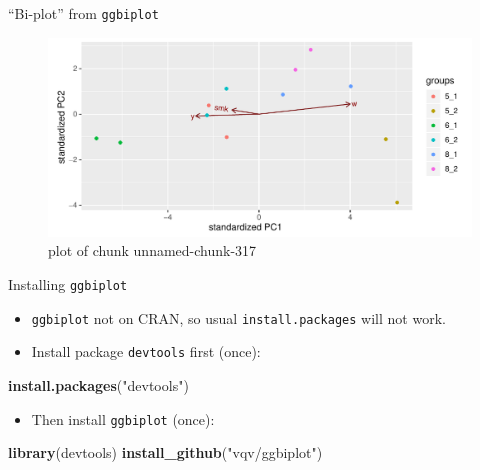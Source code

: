 \documentclass[ignorenonframetext,]{beamer}
\newenvironment{Shaded}{\begin{snugshade}}{\end{snugshade}}
\newcommand{\DataTypeTok}[1]{\textcolor[rgb]{0.13,0.29,0.53}{#1}}
\newcommand{\FloatTok}[1]{\textcolor[rgb]{0.00,0.00,0.81}{#1}}
\newcommand{\KeywordTok}[1]{\textcolor[rgb]{0.13,0.29,0.53}{\textbf{#1}}}
\newcommand{\NormalTok}[1]{#1}
\newcommand{\OperatorTok}[1]{\textcolor[rgb]{0.81,0.36,0.00}{\textbf{#1}}}
\newcommand{\StringTok}[1]{\textcolor[rgb]{0.31,0.60,0.02}{#1}}
\providecommand{\tightlist}{%
  \setlength{\itemsep}{0pt}\setlength{\parskip}{0pt}}
\begin{document}
\begin{frame}[fragile]{``Bi-plot'' from \texttt{ggbiplot}}
\protect\hypertarget{bi-plot-from-ggbiplot}{}

\begin{Shaded}
\end{Shaded}

\begin{figure}
\centering
\includegraphics{figure/unnamed-chunk-317-1.pdf}
\caption{plot of chunk unnamed-chunk-317}
\end{figure}

\end{frame}

\begin{frame}[fragile]{Installing \texttt{ggbiplot}}
\protect\hypertarget{installing-ggbiplot}{}

\begin{itemize}
\item
  \texttt{ggbiplot} not on CRAN, so usual \texttt{install.packages} will
  not work.
\item
  Install package \texttt{devtools} first (once):
\end{itemize}

\begin{Shaded}
\begin{Highlighting}[]
\KeywordTok{install.packages}\NormalTok{(}\StringTok{"devtools"}\NormalTok{)}
\end{Highlighting}
\end{Shaded}

\begin{itemize}
\tightlist
\item
  Then install \texttt{ggbiplot} (once):
\end{itemize}

\begin{Shaded}
\begin{Highlighting}[]
\KeywordTok{library}\NormalTok{(devtools)}
\KeywordTok{install_github}\NormalTok{(}\StringTok{"vqv/ggbiplot"}\NormalTok{)}
\end{Highlighting}
\end{Shaded}

\end{frame}
\end{document}
